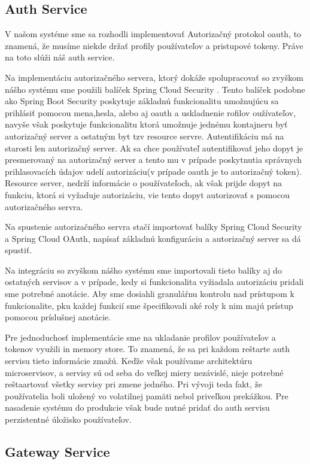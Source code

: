 \subsection{Auth Service}
V našom systéme sme sa rozhodli implementovať Autorizačný protokol \acrshort{oauth}, to znamená, že musíme niekde držať profily používateľov a pristupové tokeny. Práve na toto slúži náš auth service.

Na implementáciu autorizačného servera, ktorý dokáže spolupracovať so zvyškom nášho systému sme použili balíček Spring Cloud Security \cite{cloud_security}. Tento balíček podobne ako Spring Boot Security poskytuje základnú funkcionalitu umožnujúcu sa prihlásiť pomocou mena,hesla, alebo aj \acrshort{oauth} a uskladnenie rofilov oužívateľov, navyše však poskytuje funkcionalitu ktorá umožnuje jednému kontajneru byť autorizačný server a ostatným byt tzv resource servre. 
Autentifikáciu má na starosti len autorizačný server. Ak sa chce používateľ autentifikovať jeho dopyt je presmerovaný na autorizačný server a tento mu v prípade poskytnutia správnych prihlasovacích údajov udelí autorizáciu(v prípade \acrshort{oauth} je to autorizačný token). 
Resource server, nedrží informácie o používateľoch, ak však prijde dopyt na funkciu, ktorá si vyžaduje autorizáciu, vie tento dopyt autorizovať s pomocou autorizačného servra.

Na spustenie autorizačného servra stačí importovať balíky  Spring Cloud Security a Spring Cloud OAuth, napísať základnú konfiguráciu a autorizačný server sa dá spustiť. 

Na integráciu so zvyškom nášho systému sme importovali tieto balíky aj do ostatných servisov a v prípade, kedy si funkcionalita vyžiadala autorizáciu  pridali sme potrebné anotácie. Aby sme dosiahli granuláŕnu kontrolu nad prístupom k funkcionalite, pku každej funkcií sme špecifikovali aké roly k nim majú prístup pomocou príslušnej anotácie.

Pre jednoduchosť implementácie sme na ukladanie profilov používateľov a tokenov využili in memory store. To znamená, že sa pri každom reštarte auth servisu tieto informácie zmažú. Keďže však používame architektúru microservisov, a servisy sú od seba do veľkej miery nezávislé, nieje potrebné reštaartovať všetky servisy pri zmene jedného. Pri vývoji teda fakt, že používatelia boli uložený vo volatilnej pamäti nebol priveľkou prekážkou. Pre nasadenie systému do produkcie však bude nutné pridať do auth servisu perzistentné úložisko používateľov. 
 
\subsection{Gateway Service} 

